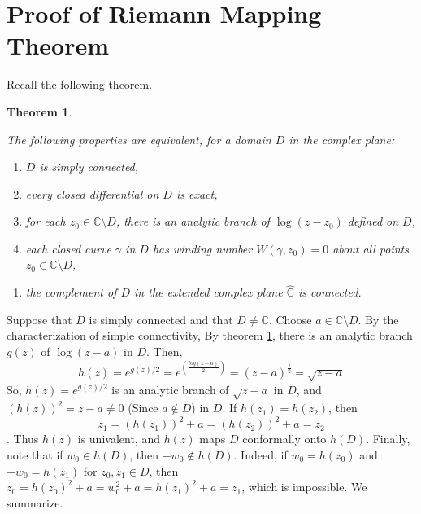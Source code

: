 \documentclass[
]{book}
\providecommand{\tightlist}{%
  \setlength{\itemsep}{0pt}\setlength{\parskip}{0pt}}
\newtheorem{theorem}{Theorem}[chapter]
\theoremstyle{definition}
\theoremstyle{definition}
\theoremstyle{definition}
\theoremstyle{definition}
\theoremstyle{remark}
\begin{document}
\section{Proof of Riemann Mapping Theorem}\label{proof-of-riemann-mapping-theorem}

Recall the following theorem.

\begin{theorem}
\protect\hypertarget{thm:thm1}{}\label{thm:thm1}

The following properties are equivalent, for a domain \(D\) in the complex plane:

\begin{enumerate}
\def\labelenumi{\roman{enumi}.}
\tightlist
\item
  \(D\) is simply connected,
\item
  every closed differential on \(D\) is exact,
\item
  for each \(z_0 \in \mathbb{C} \setminus D\), there is an analytic branch of \(\log(z - z_0)\) defined
  on \(D\),
\item
  each closed curve \(\gamma\) in \(D\) has winding number \(W(\gamma, z_0) = 0\) about all points \(z_0 \in \mathbb{C} \setminus D\),
\end{enumerate}

\begin{enumerate}
\def\labelenumi{(\alph{enumi})}
\setcounter{enumi}{21}
\tightlist
\item
  the complement of \(D\) in the extended complex plane \(\hat{\mathbb{C}}\) is connected.
\end{enumerate}

\end{theorem}

Suppose that \(D\) is simply connected and that \(D \neq \mathbb{C}\). Choose \(a \in \mathbb{C} \setminus D\). By the characterization of simple connectivity,
By theorem \ref{thm:thm1}, there is an analytic branch \(g(z)\) of \(\log(z - a)\) in \(D\).
Then,
\[h(z) = e^{g(z)/2}=e^{\left(\frac{log(z-a)}{2}\right)}=(z-a)^{\frac{1}{2}}=\sqrt{z-a}\]
So, \(h(z) = e^{g(z)/2}\) is an analytic branch of \(\sqrt{z - a}\) in \(D\), and \((h(z))^2 = z - a \neq 0\) (Since \(a\not\in D\)) in \(D\). If \(h(z_1) = h(z_2)\), then \[z_1 = (h(z_1))^2 + a = (h(z_2))^2 + a = z_2\].
Thus \(h(z)\) is univalent, and \(h(z)\) maps \(D\) conformally onto \(h(D)\). Finally, note that if \(w_0 \in h(D)\), then \(-w_0 \notin h(D)\). Indeed, if \(w_0 = h(z_0)\) and \(-w_0 = h(z_1)\) for \(z_0, z_1 \in D\), then \(z_0 = h(z_0)^2 + a = w_0^2 + a = h(z_1)^2 + a = z_1\), which is impossible. We summarize.
\end{document}
